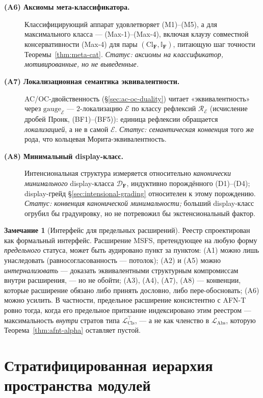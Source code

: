 \documentclass[11pt]{article}
\theoremstyle{plain}
\theoremstyle{definition}
\newtheorem{remark}[theorem]{Замечание}
\newcommand{\LClsMax}{\mathcal{L}_{\mathrm{Cls}}^{\top}}
\newcommand{\LAbs}{\mathcal{L}_{\mathrm{Abs}}}
\newcommand{\Cl}{\mathrm{Cl}}
\newcommand{\cE}{\mathcal{E}}
\begin{document}
\begin{description}
\item[\textbf{(A6) Аксиомы мета-классификатора.}] Классифицирующий аппарат удовлетворяет (M1)--(M5), а для максимального класса — (Max-1)--(Max-4), включая клаузу совместной консервативности (Max-4) для пары $(\Cl_{\mathbf{F}}, \mathbb{I}_{\mathbf{F}})$, питающую шаг точности Теоремы~\ref{thm:meta-cat}. \emph{Статус: аксиомы на классификатор, мотивированные, но не выведенные.}
\item[\textbf{(A7) Локализационная семантика эквивалентности.}] AC/OC-двойственность (\S\ref{sec:ac-oc-duality}) читает «эквивалентность» через $\mathrm{gauge}_\cE$ — $2$-локализацию $\cE$ по классу рефлексий $\mathcal{R}_\cE$ (исчисление дробей Пронк, (BF1)--(BF5)): единица рефлексии обращается \emph{локализацией}, а не в самой $\cE$. \emph{Статус: семантическая конвенция} того же рода, что кольцевая Морита-эквивалентность.
\item[\textbf{(A8) Минимальный display-класс.}] Интенсиональная структура измеряется относительно \emph{канонически минимального} display-класса $\mathcal{D}_{\mathbf{F}}$, индуктивно порождённого (D1)--(D4); display-грейд \S\ref{sec:intensional-grading} относителен к этому порождению. \emph{Статус: конвенция канонической минимальности;} больший display-класс огрубил бы градуировку, но не потревожил бы экстенсиональный фактор.
\end{description}

\begin{remark}[Интерфейс для предельных расширений]\label{rem:register-interface}
Реестр спроектирован как формальный интерфейс. Расширение MSFS, претендующее на любую форму \emph{предельного} статуса, может быть аудировано пункт за пунктом: (A1) можно лишь унаследовать (равносогласованность — потолок); (A2) и (A5) можно \emph{интернализовать} --- доказать эквивалентными структурным компромиссам внутри расширения, --- но не обойти; (A3), (A4), (A7), (A8) — конвенции, которые расширение обязано либо принять дословно, либо пере-обосновать; (A6) можно усилить. В частности, предельное расширение консистентно с AFN-T ровно тогда, когда его предельное притязание индексировано этим реестром --- максимальность \emph{внутри} стратов типа $\LClsMax$, --- а не как членство в $\LAbs$, которую Теорема~\ref{thm:afnt-alpha} оставляет пустой.
\end{remark}

\section{Стратифицированная иерархия пространства модулей}\label{sec:hierarchy}
\end{document}
